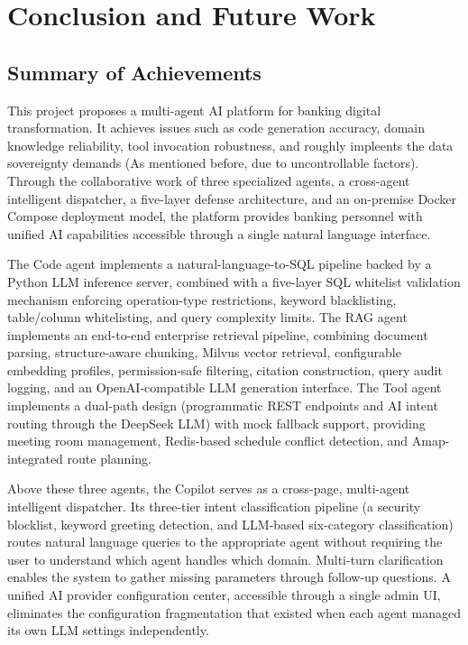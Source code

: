 \section{Conclusion and Future Work}

\subsection{Summary of Achievements}

This project proposes a multi-agent AI platform for banking digital transformation. It achieves issues such as code generation accuracy, domain knowledge reliability, tool invocation robustness, and roughly impleents the data sovereignty demands (As mentioned before, due to uncontrollable factors). Through the collaborative work of three specialized agents, a cross-agent intelligent dispatcher, a five-layer defense architecture, and an on-premise Docker Compose deployment model, the platform provides banking personnel with unified AI capabilities accessible through a single natural language interface.

The Code agent implements a natural-language-to-SQL pipeline backed by a Python LLM inference server, combined with a five-layer SQL whitelist validation mechanism enforcing operation-type restrictions, keyword blacklisting, table/column whitelisting, and query complexity limits. The RAG agent implements an end-to-end enterprise retrieval pipeline, combining document parsing, structure-aware chunking, Milvus vector retrieval, configurable embedding profiles, permission-safe filtering, citation construction, query audit logging, and an OpenAI-compatible LLM generation interface. The Tool agent implements a dual-path design (programmatic REST endpoints and AI intent routing through the DeepSeek LLM) with mock fallback support, providing meeting room management, Redis-based schedule conflict detection, and Amap-integrated route planning.

Above these three agents, the Copilot serves as a cross-page, multi-agent intelligent dispatcher. Its three-tier intent classification pipeline (a security blocklist, keyword greeting detection, and LLM-based six-category classification) routes natural language queries to the appropriate agent without requiring the user to understand which agent handles which domain. Multi-turn clarification enables the system to gather missing parameters through follow-up questions. A unified AI provider configuration center, accessible through a single admin UI, eliminates the configuration fragmentation that existed when each agent managed its own LLM settings independently.

